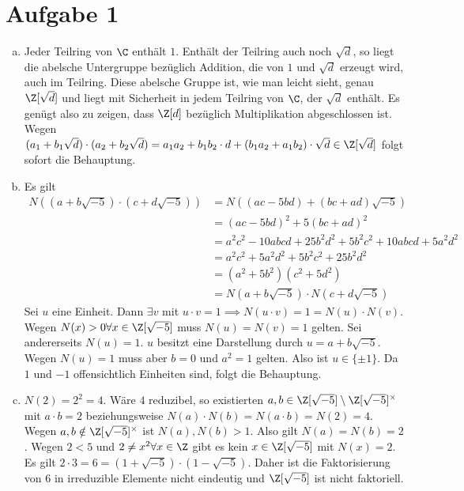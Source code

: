 \documentclass{article}
\begin{document}
\def\headheight{25pt}
    \section*{Aufgabe 1}
    \begin{enumerate}[(a)]
        \item Jeder Teilring von $\C$ enthält $1$. Enthält der Teilring auch noch $\sqrt{d}$, so liegt die abelsche Untergruppe bezüglich Addition, die von $1$ und $\sqrt{d}$ erzeugt wird, auch im Teilring. Diese abelsche Gruppe ist, wie man leicht sieht, genau $\Z[\sqrt{d}]$ und liegt mit Sicherheit in jedem Teilring von $\C$, der $\sqrt{d}$ enthält. Es genügt also zu zeigen, dass $\Z[d]$ bezüglich Multiplikation abgeschlossen ist. Wegen $(a_1 + b_1\sqrt{d})\cdot (a_2 + b_2\sqrt{d}) = a_1a_2 + b_1b_2\cdot d + (b_1a_2 + a_1b_2)\cdot \sqrt{d} \in \Z[\sqrt{d}]$ folgt sofort die Behauptung.
        \item Es gilt
        \begin{align*}
            N((a + b\sqrt{-5}) \cdot (c + d\sqrt{-5})) &= N((ac - 5bd) + (bc + ad)\sqrt{-5})\\
            &= (ac - 5bd)^2 + 5 (bc + ad)^2\\
            &= a^2c^2 - 10 abcd + 25b^2d^2 + 5b^2c^2 + 10abcd + 5a^2d^2\\
            &= a^2c^2 + 5a^2d^2 + 5b^2c^2 + 25b^2d^2\\
            &= (a^2 + 5b^2)(c^2 + 5d^2)\\
            &= N(a + b\sqrt{-5}) \cdot N(c + d \sqrt{-5})
        \end{align*}
        Sei $u$ eine Einheit. Dann $\exists v$ mit $u\cdot v = 1 \implies N(u\cdot v) = 1 = N(u)\cdot N(v)$. Wegen $N(x) > 0 \forall x \in \Z[\sqrt{-5}]$ muss $N(u) = N(v) = 1$ gelten. Sei andererseits $N(u) = 1$. $u$ besitzt eine Darstellung durch $u = a + b\sqrt{-5}$. Wegen $N(u) = 1$ muss aber $b = 0$ und $a^2 = 1$ gelten. Also ist $u \in \{\pm 1\}$. Da $1$ und $-1$ offensichtlich Einheiten sind, folgt die Behauptung.
        \item $N(2) = 2^2 = 4$. Wäre $4$ reduzibel, so existierten $a, b\in \Z[\sqrt{-5}]\setminus \Z[\sqrt{-5}]^\times$ mit $a \cdot b = 2$ beziehungsweise $N(a) \cdot N(b) = N(a\cdot b) = N(2) = 4$. Wegen $a, b \notin \Z[\sqrt{-5}]^\times$ ist $N(a), N(b) > 1$. Also gilt $N(a) = N(b) = 2$. Wegen $2 < 5$ und $2\neq x^2 \forall x \in \Z$ gibt es kein $x \in \Z[\sqrt{-5}]$ mit $N(x) = 2$.
        Es gilt $2 \cdot 3 = 6 = (1 + \sqrt{-5}) \cdot (1 - \sqrt{-5})$. Daher ist die Faktorisierung von $6$ in irreduzible Elemente nicht eindeutig und $\Z[\sqrt{-5}]$ ist nicht faktoriell.
    \end{enumerate}
\end{document}

